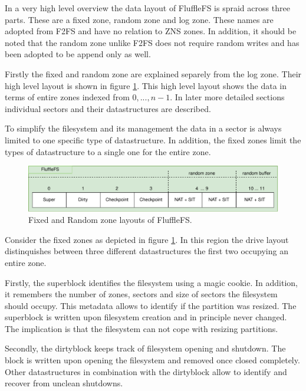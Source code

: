 In a very high level overview the data layout of FluffleFS is spraid across
three parts. These are a fixed zone, random zone and log zone. These names are
adopted from F2FS and have no relation to ZNS zones. In addition, it should be
noted that the random zone unlike F2FS does not require random writes and has
been adopted to be append only as well.

Firstly the fixed and random zone are explained separely from the log zone.
Their high level layout is shown in figure \ref{figure:flufflelayout}. This high
level layout shows the data in terms of entire zones indexed from ${0,...,n-1}$.
In later more detailed sections individual sectors and their datastructures
are described.

To simplify the filesystem and its management the data in a sector is always
limited to one specific type of datastructure. In addition, the fixed zones
limit the types of datastructure to a single one for the entire zone.

\begin{figure}[h!]
    \centering
	\includegraphics[width=1\textwidth]{resources/images/fluffle-layout.pdf}
	\caption{Fixed and Random zone layouts of FluffleFS.}
    \label{figure:flufflelayout}
\end{figure}

Consider the fixed zones as depicted in figure \ref{figure:flufflelayout}. In
this region the drive layout distinquishes between three different
datastructures the first two occupying an entire zone.

Firstly, the superblock identifies the filesystem using a magic cookie. In
addition, it remembers the number of zones, sectors and size of sectors the
filesystem should occupy. This metadata allows to identify if the partition was
resized. The superblock is written upon filesystem creation and in principle
never changed. The implication is that the filesystem can not cope with resizing
partitions.

Secondly, the dirtyblock keeps track of filesystem opening and shutdown. The 
block is written upon opening the filesystem and removed once closed completely.
Other datastructures in combination with the dirtyblock allow to identify and
recover from unclean shutdowns.

